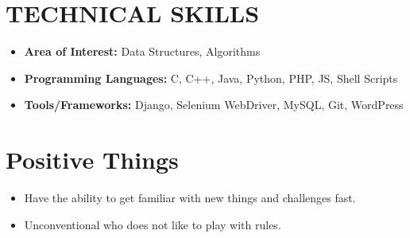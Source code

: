 \documentclass[line, margin, 12pt]{res}
\begin{document}
\begin{resume}
\section{TECHNICAL SKILLS}
\begin{itemize}
\item \textbf{Area of Interest:} Data Structures, Algorithms
\item \textbf{Programming Languages:} C, C++, Java, Python, PHP, JS, Shell Scripts
\item \textbf{Tools/Frameworks:} Django, Selenium WebDriver, MySQL, Git, WordPress\\
\end{itemize}

\section{Positive Things}
\begin{itemize}
\item Have the ability to get familiar with new things and challenges fast.
\item Unconventional who does not like to play with rules.
\end{itemize}

\end{resume}
\end{document}
